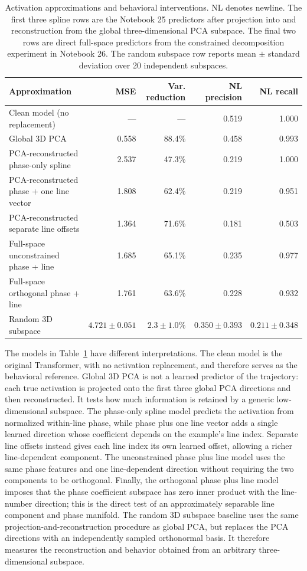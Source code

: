 \documentclass[11pt]{article}
\begin{document}
\begin{table}[t]
\centering
\small
\begin{tabular}{lrrrr}
\toprule
Approximation & MSE & Var. reduction & NL precision & NL recall \\
\midrule
Clean model (no replacement) & --- & --- & 0.519 & 1.000 \\
Global 3D PCA & 0.558 & 88.4\% & 0.458 & 0.993 \\
PCA-reconstructed phase-only spline & 2.537 & 47.3\% & 0.219 & 1.000 \\
PCA-reconstructed phase + one line vector & 1.808 & 62.4\% & 0.219 & 0.951 \\
PCA-reconstructed separate line offsets & 1.364 & 71.6\% & 0.181 & 0.503 \\
Full-space unconstrained phase + line & 1.685 & 65.1\% & 0.235 & 0.977 \\
Full-space orthogonal phase + line & 1.761 & 63.6\% & 0.228 & 0.932 \\
Random 3D subspace & $4.721\pm0.051$ & $2.3\pm1.0\%$ & $0.350\pm0.393$ & $0.211\pm0.348$ \\
\bottomrule
\end{tabular}
\caption{Activation approximations and behavioral interventions. NL denotes
newline. The first three spline rows are the Notebook 25 predictors after
projection into and reconstruction from the global three-dimensional PCA
subspace. The final two rows are direct full-space predictors from the
constrained decomposition experiment in Notebook 26. The random
subspace row reports mean $\pm$ standard deviation over 20 independent
subspaces.}
\label{tab:activation-approximations}
\end{table}

The models in Table~\ref{tab:activation-approximations} have different
interpretations. The clean model is the original Transformer, with no
activation replacement, and therefore serves as the behavioral reference.
Global 3D PCA is not a learned predictor of the trajectory: each true
activation is projected onto the first three global PCA directions and then
reconstructed. It tests how much information is retained by a generic
low-dimensional subspace. The phase-only spline model predicts the activation
from normalized within-line phase, while phase plus one line vector adds a
single learned direction whose coefficient depends on the example's line
index. Separate line offsets instead gives each line index its own learned
offset, allowing a richer line-dependent component. The unconstrained phase
plus line model uses the same phase features and one line-dependent direction
without requiring the two components to be orthogonal. Finally, the
orthogonal phase plus line model imposes that the phase coefficient subspace
has zero inner product with the line-number direction; this is the direct
test of an approximately separable line component and phase manifold.
The random 3D subspace baseline uses the same projection-and-reconstruction
procedure as global PCA, but replaces the PCA directions with an independently
sampled orthonormal basis. It therefore measures the reconstruction and
behavior obtained from an arbitrary three-dimensional subspace.
\end{document}
